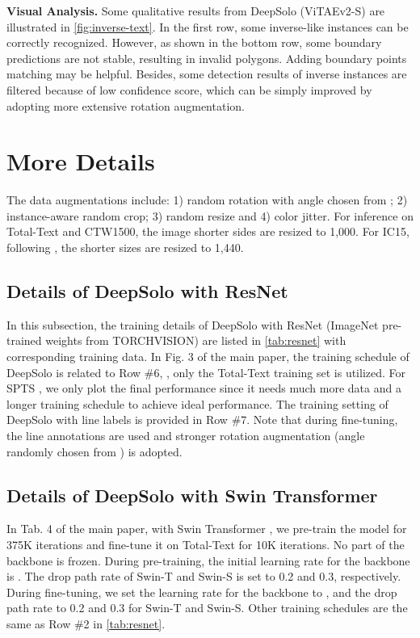 \documentclass[10pt,twocolumn,letterpaper]{article}
\begin{document}
\begin{table}[!t]
\noindent \textbf{Visual Analysis.} Some qualitative results from DeepSolo (ViTAEv2-S) are illustrated in \cref{fig:inverse-text}. In the first row, some inverse-like instances can be correctly recognized. However, as shown in the bottom row, some boundary predictions are not stable, resulting in invalid polygons. Adding boundary points matching may be helpful. Besides, some detection results of inverse instances are filtered because of low confidence score, which can be simply improved by adopting more extensive rotation augmentation.

\section{More Details}
\label{sec:more_details}

The data augmentations include: 1) random rotation with angle chosen from ; 2) instance-aware random crop; 3) random resize and 4) color jitter. For inference on Total-Text and CTW1500, the image shorter sides are resized to 1,000. For IC15, following \cite{liao2020mask,zhang2022text}, the shorter sizes are resized to 1,440.

\subsection{Details of DeepSolo with ResNet}
In this subsection, the training details of DeepSolo with ResNet \cite{he2016deep} (ImageNet pre-trained weights from TORCHVISION) are listed in \cref{tab:resnet} with corresponding training data. In Fig. 3 of the main paper, the training schedule of DeepSolo is related to Row \#6, \ie, only the Total-Text training set is utilized. For SPTS \cite{peng2022spts}, we only plot the final performance since it needs much more data and a longer training schedule to achieve ideal performance. The training setting of DeepSolo with line labels is provided in Row \#7. Note that during fine-tuning, the line annotations are used and stronger rotation augmentation (angle randomly chosen from ) is adopted.

\subsection{Details of DeepSolo with Swin Transformer}
\label{sec:details_swin}
In Tab. 4 of the main paper, with Swin Transformer \cite{liu2021swin}, we pre-train the model for 375K iterations and fine-tune it on Total-Text for 10K iterations. No part of the backbone is frozen. During pre-training, the initial learning rate for the backbone is . The drop path rate of Swin-T and Swin-S is set to 0.2 and 0.3, respectively. During fine-tuning, we set the learning rate for the backbone to , and the drop path rate to 0.2 and 0.3 for Swin-T and Swin-S. Other training schedules are the same as Row \#2 in \cref{tab:resnet}.


\end{table}
\end{document}
